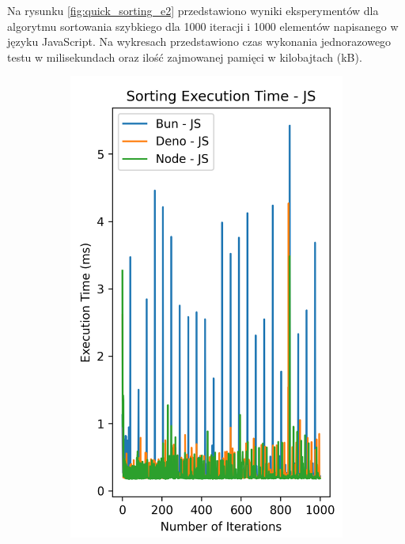 Na rysunku \ref{fig:quick_sorting_e2} przedstawiono wyniki eksperymentów dla algorytmu sortowania szybkiego dla 1000 iteracji i 1000 elementów napisanego w języku JavaScript. Na wykresach przedstawiono czas wykonania jednorazowego testu w milisekundach oraz ilość zajmowanej pamięci w kilobajtach (kB).

\begin{figure}[H]
  \centering
  \begin{subfigure}[b]{0.44\textwidth}
    \centering
    \includegraphics[width=\textwidth]{Figures/sorting/sorting_quick_1000_1000_js_time.png}

\end{subfigure}
\end{figure}
